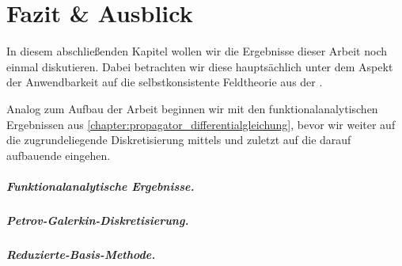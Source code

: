 \documentclass[../main.tex]{subfiles}
\begin{document}
\chapter{Fazit \& Ausblick} %
\label{chapter:ausblick}

In diesem abschließenden Kapitel wollen wir die Ergebnisse dieser Arbeit noch einmal diskutieren.
Dabei betrachten wir diese hauptsächlich unter dem Aspekt der Anwendbarkeit auf die selbstkonsistente Feldtheorie aus der .

Analog zum Aufbau der Arbeit beginnen wir mit den funktionalanalytischen Ergebnissen aus \cref{chapter:propagator_differentialgleichung}, bevor wir weiter auf die zugrundeliegende Diskretisierung mittels  und zuletzt auf die darauf aufbauende  eingehen.

\paragraph{Funktionalanalytische Ergebnisse.} %
\label{par:funktionalanalytische_ergebnisse}

\blindtext

\paragraph{Petrov-Galerkin-Diskretisierung.} %
\label{par:petrov_galerkin_diskretisierung}

\blindtext

\paragraph{Reduzierte-Basis-Methode.} %
\label{par:reduzierte_basis_methode}

\blindtext
\end{document}
